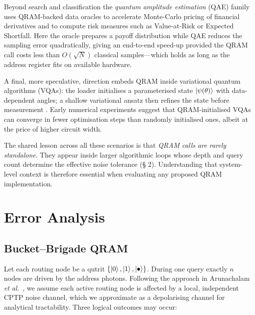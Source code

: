 \documentclass[11pt]{article}
\begin{document}
Beyond search and classification the \emph{quantum amplitude
estimation} (QAE) family uses QRAM-backed data oracles to accelerate
Monte-Carlo pricing of financial derivatives
\cite{Kaneko2020}
and to compute risk measures such as Value-at-Risk or
Expected Shortfall.
Here the oracle prepares a payoff distribution while QAE reduces the
sampling error quadratically, giving an end-to-end speed-up provided the
QRAM call costs less than $O(\sqrt{N})$ classical samples—which
holds as long as the address register fits on available hardware.

A final, more speculative, direction embeds QRAM inside variational
quantum algorithms (VQAs): the loader initialises a parameterised state
$\ket{\psi(\theta)}$ with data-dependent angles;
a shallow variational ansatz then refines the state before measurement
\cite{Gilyen2023}.
Early numerical experiments suggest that QRAM-initialised VQAs can
converge in fewer optimisation steps than randomly initialised ones,
albeit at the price of higher circuit width.

The shared lesson across all these scenarios is that \emph{QRAM calls
are rarely standalone}.
They appear inside larger algorithmic loops whose depth and query count
determine the effective noise tolerance (§ 2).
Understanding that system-level context is therefore essential when
evaluating any proposed QRAM implementation.

\section{Error Analysis}

\subsection{Bucket--Brigade QRAM}
\label{ssec:bbqram}

Let each routing node be a qutrit
\(\{\ket{0},\ket{1},\ket{\bullet}\}\).
During one query exactly \(n\) nodes are driven by the address photons.
Following the approach in Arunachalam \emph{et al.}~\cite{Arunachalam2015}, we assume each active routing node is affected by a local, independent CPTP noise channel, which we approximate as a depolarising channel for analytical tractability.
Three logical outcomes may occur:
\end{document}

